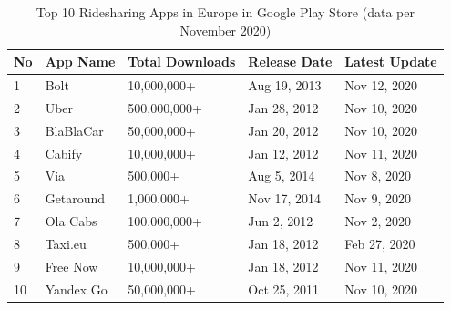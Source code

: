 \documentclass[12pt]{article}
\begin{document}
\begin{table}[h]
\centering
\caption{Top 10 Ridesharing Apps in Europe in Google Play Store (data per November 2020)}
\begin{tabular}{lllll}
\hline
\textbf{No} & \textbf{App Name} & \textbf{Total Downloads} & \textbf{Release Date} & \textbf{Latest Update}  \\
\hline
1           & Bolt              & 10,000,000+              & Aug 19, 2013          & Nov 12, 2020            \\
2           & Uber              & 500,000,000+             & Jan 28, 2012          & Nov 10, 2020            \\
3           & BlaBlaCar         & 50,000,000+              & Jan 20, 2012          & Nov 10, 2020            \\
4           & Cabify            & 10,000,000+              & Jan 12, 2012          & Nov 11, 2020            \\
5           & Via               & 500,000+                 & Aug 5, 2014           & Nov 8, 2020             \\
6           & Getaround         & 1,000,000+               & Nov 17, 2014          & Nov 9, 2020             \\
7           & Ola Cabs          & 100,000,000+             & Jun 2, 2012           & Nov 2, 2020             \\
8           & Taxi.eu           & 500,000+                 & Jan 18, 2012          & Feb 27, 2020            \\
9           & Free Now          & 10,000,000+              & Jan 18, 2012          & Nov 11, 2020            \\
10          & Yandex Go         & 50,000,000+              & Oct 25, 2011          & Nov 10, 2020     \\
\hline
\end{tabular}
\label{tab:top10_playstore}


\end{table}
\end{document}
